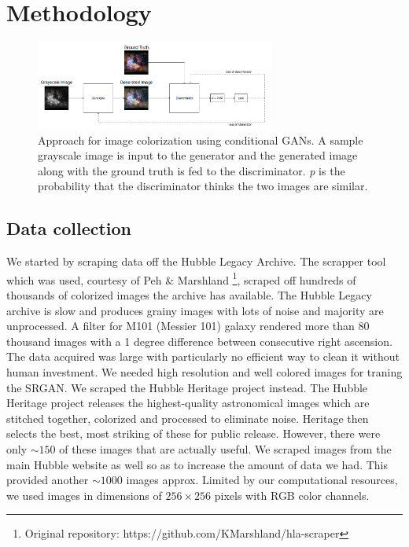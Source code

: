 \documentclass[10pt,twocolumn,letterpaper]{article}
\begin{document}
\section{Methodology}
     \begin{figure}[!htb]
        \centering
        \includegraphics[width=0.7\textwidth]{figures/gan_visualization.png}
        \caption{Approach for image colorization using conditional GANs. A sample grayscale image is input to the generator and the generated image along with the ground truth is fed to the discriminator. \textit{p} is the probability that the discriminator thinks the two images are similar.}
        \label{fig:gan_visualization}
    \end{figure}
    \subsection{Data collection}
    \hspace*{0.167 in}We started by scraping data off the Hubble Legacy Archive. The scrapper tool %
    which was used, courtesy of Peh \& Marshland \cite{Gao2019astronomical}\footnote{Original repository: https://github.com/KMarshland/hla-scraper}, scraped off hundreds of thousands of colorized images the archive has available. The Hubble Legacy archive is slow and produces grainy images with lots of noise and majority are unprocessed. A filter for M101 (Messier 101) galaxy rendered more than 80 thousand images with a 1 degree difference between consecutive right ascension. The data acquired was large with particularly no efficient way to clean it without human investment. We needed high resolution and well colored images for traning the SRGAN.
    \hspace*{0.167 in}We scraped the Hubble Heritage project instead. The Hubble Heritage project releases the highest-quality astronomical images which are stitched together, colorized and processed to eliminate noise. Heritage then selects the best, most striking of these for public release. However, there were only $\sim150$ of these images that are actually useful. We scraped images from the main Hubble website as well so as to increase the amount of data we had. This provided another $\sim1000$ images approx. Limited by our computational resources, we used images in dimensions of $256\times 256$ pixels with RGB color channels.
\end{document}
